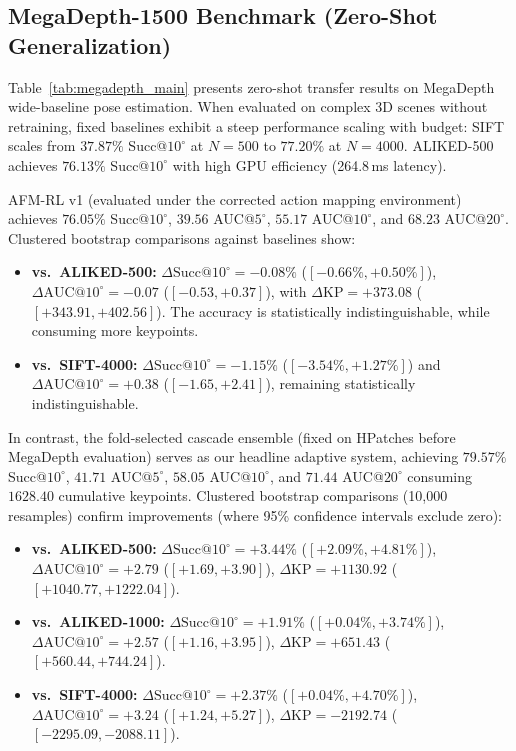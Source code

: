 \documentclass[conference]{IEEEtran}
\begin{document}
\subsection{MegaDepth-1500 Benchmark (Zero-Shot Generalization)}
Table~\ref{tab:megadepth_main} presents zero-shot transfer results on MegaDepth wide-baseline pose estimation. When evaluated on complex 3D scenes without retraining, fixed baselines exhibit a steep performance scaling with budget: SIFT scales from $37.87\%$ Succ@$10^\circ$ at $N=500$ to $77.20\%$ at $N=4000$. ALIKED-500 achieves $76.13\%$ Succ@$10^\circ$ with high GPU efficiency (264.8\,ms latency).

AFM-RL v1 (evaluated under the corrected action mapping environment) achieves $76.05\%$ Succ@$10^\circ$, $39.56$ AUC@$5^\circ$, $55.17$ AUC@$10^\circ$, and $68.23$ AUC@$20^\circ$. Clustered bootstrap comparisons against baselines show:
\begin{itemize}
    \item \textbf{vs.\ ALIKED-500:} $\Delta\text{Succ}@10^\circ = -0.08\%$ ($[-0.66\%, +0.50\%]$), $\Delta\text{AUC}@10^\circ = -0.07$ ($[-0.53, +0.37]$), with $\Delta\text{KP} = +373.08$ ($[+343.91, +402.56]$). The accuracy is statistically indistinguishable, while consuming more keypoints.
    \item \textbf{vs.\ SIFT-4000:} $\Delta\text{Succ}@10^\circ = -1.15\%$ ($[-3.54\%, +1.27\%]$) and $\Delta\text{AUC}@10^\circ = +0.38$ ($[-1.65, +2.41]$), remaining statistically indistinguishable.
\end{itemize}

In contrast, the fold-selected cascade ensemble (fixed on HPatches before MegaDepth evaluation) serves as our headline adaptive system, achieving $79.57\%$ Succ@$10^\circ$, $41.71$ AUC@$5^\circ$, $58.05$ AUC@$10^\circ$, and $71.44$ AUC@$20^\circ$ consuming $1628.40$ cumulative keypoints. Clustered bootstrap comparisons (10,000 resamples) confirm improvements (where 95\% confidence intervals exclude zero):
\begin{itemize}
    \item \textbf{vs.\ ALIKED-500:} $\Delta\text{Succ}@10^\circ = +3.44\%$ ($[+2.09\%, +4.81\%]$), $\Delta\text{AUC}@10^\circ = +2.79$ ($[+1.69, +3.90]$), $\Delta\text{KP} = +1130.92$ ($[+1040.77, +1222.04]$).
    \item \textbf{vs.\ ALIKED-1000:} $\Delta\text{Succ}@10^\circ = +1.91\%$ ($[+0.04\%, +3.74\%]$), $\Delta\text{AUC}@10^\circ = +2.57$ ($[+1.16, +3.95]$), $\Delta\text{KP} = +651.43$ ($[+560.44, +744.24]$).
    \item \textbf{vs.\ SIFT-4000:} $\Delta\text{Succ}@10^\circ = +2.37\%$ ($[+0.04\%, +4.70\%]$), $\Delta\text{AUC}@10^\circ = +3.24$ ($[+1.24, +5.27]$), $\Delta\text{KP} = -2192.74$ ($[-2295.09, -2088.11]$).
\end{itemize}
\end{document}
